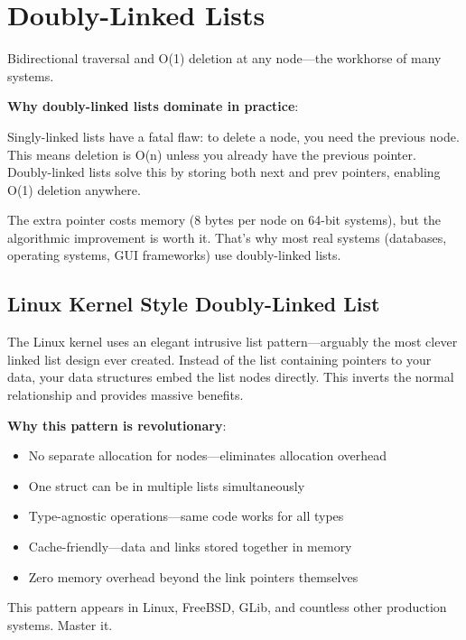 \section{Doubly-Linked Lists}

Bidirectional traversal and O(1) deletion at any node---the workhorse of many systems.

\textbf{Why doubly-linked lists dominate in practice}:

Singly-linked lists have a fatal flaw: to delete a node, you need the previous node. This means deletion is O(n) unless you already have the previous pointer. Doubly-linked lists solve this by storing both next and prev pointers, enabling O(1) deletion anywhere.

The extra pointer costs memory (8 bytes per node on 64-bit systems), but the algorithmic improvement is worth it. That's why most real systems (databases, operating systems, GUI frameworks) use doubly-linked lists.

\subsection{Linux Kernel Style Doubly-Linked List}

The Linux kernel uses an elegant intrusive list pattern---arguably the most clever linked list design ever created. Instead of the list containing pointers to your data, your data structures embed the list nodes directly. This inverts the normal relationship and provides massive benefits.

\textbf{Why this pattern is revolutionary}:
\begin{itemize}
    \item No separate allocation for nodes---eliminates allocation overhead
    \item One struct can be in multiple lists simultaneously
    \item Type-agnostic operations---same code works for all types
    \item Cache-friendly---data and links stored together in memory
    \item Zero memory overhead beyond the link pointers themselves
\end{itemize}

This pattern appears in Linux, FreeBSD, GLib, and countless other production systems. Master it.

